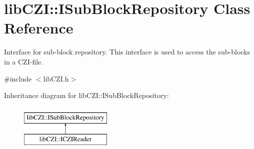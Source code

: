 \hypertarget{classlib_c_z_i_1_1_i_sub_block_repository}{}\section{lib\+C\+ZI\+:\+:I\+Sub\+Block\+Repository Class Reference}
\label{classlib_c_z_i_1_1_i_sub_block_repository}


Interface for sub-\/block repository. This interface is used to access the sub-\/blocks in a C\+Z\+I-\/file.  




{\ttfamily \#include $<$lib\+C\+Z\+I.\+h$>$}

Inheritance diagram for lib\+C\+ZI\+:\+:I\+Sub\+Block\+Repository\+:\begin{figure}[H]
\begin{center}
\leavevmode
\includegraphics[height=2.000000cm]{classlib_c_z_i_1_1_i_sub_block_repository}
\end{center}
\end{figure}
